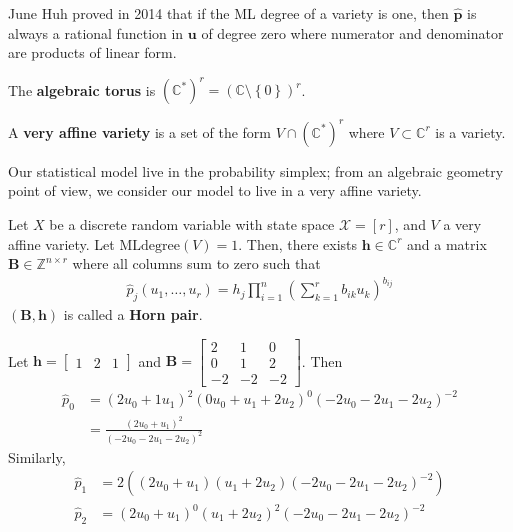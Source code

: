 June Huh proved in 2014 that if the ML degree of a variety is one, then  \( \hat{\mathbf p} \) is always a rational function in \( \mathbf u \) of degree zero where numerator and denominator are products of linear form.

\begin{defi}
  The \textbf{algebraic torus} is \( (\mathbb{C}^*)^r = (\mathbb{C} \setminus \left\{ 0 \right\})^r \).
\end{defi}

\begin{defi}
  A \textbf{very affine variety} is a set of the form \( V \cap (\mathbb{C}^*)^r \) where \( V \subset \mathbb{C}^r \) is a variety.
\end{defi}

Our statistical model live in the probability simplex; from an algebraic geometry point of view, we consider our model to live in a very affine variety.

\begin{thm}
  Let \( X \) be a discrete random variable with state space \( \mathcal{X} = [r] \), and \( V \) a very affine variety.
  Let \( \mathrm{MLdegree}(V) = 1 \). Then, there exists \( \mathbf h  \in \mathbb{C}^r \) and a matrix \( \mathbf B \in \mathbb{Z}^{n \times r} \) where all columns sum to zero such that 
  \begin{align*}
    \hat p_j(u_1, \dots, u_r) = h_j \prod^n_{i=1}\left( \sum^r_{k=1} b_{ik} u_k \right)^{b_{ij}}
  \end{align*}
  \( (\mathbf B,\mathbf h) \) is called a \textbf{Horn pair}.
\end{thm}

\begin{eg}
  Let \( \mathbf h = \begin{bmatrix}
    1 & 2 & 1
  \end{bmatrix} \) and \( \mathbf B = \begin{bmatrix}
    2 & 1 & 0 \\ 0 & 1 & 2 \\ -2 & -2 & -2
  \end{bmatrix} \). Then 
  \begin{align*}
    \hat p_0 &= (2u_0 + 1u_1)^2  (0u_0 + u_1 + 2u_2)^0  (-2u_0 - 2u_1 - 2u_2)^{-2}\\ &= \frac{(2u_0 + u_1)^2}{(-2u_0 - 2u_1 - 2u_2)^{2}}
  \end{align*}
  Similarly, 
  \begin{align*}
    \hat p_1 &= 2\left( (2u_0 + u_1) (u_1 + 2u_2) (-2u_0 - 2u_1 - 2u_2)^{-2} \right) \\
    \hat p_2 &= (2u_0 + u_1)^0 (u_1 + 2u_2)^{2} (-2u_0-2u_1-2u_2)^{-2}
  \end{align*}
\end{eg}

